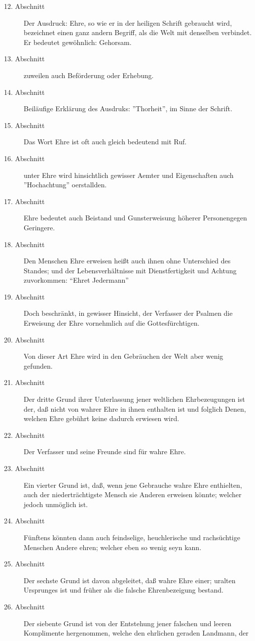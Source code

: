 \begin{description}
\item[12. Abschnitt] Der Ausdruck: Ehre, so wie er in der heiligen Schrift
gebraucht wird, bezeichnet einen ganz andern Begriff, als die Welt mit denselben
verbindet. Er bedeutet gewöhnlich: Gehorsam.
\item[13. Abschnitt] zuweilen auch Beförderung oder Erhebung.
\item[14. Abschnitt] Beiläufige Erklärung des Ausdruks: ''Thorheit'', im Sinne
der Schrift.
\item[15. Abschnitt] Das Wort Ehre ist oft auch gleich bedeutend mit Ruf.
\item[16. Abschnitt] unter Ehre wird hinsichtlich gewisser Aemter und
Eigenschaften auch ''Hochachtung'' oerstallden.
\item[17. Abschnitt] Ehre bedeutet auch Beistand und Gunsterweisung höherer
Personengegen Geringere.
\item[18. Abschnitt]  Den Menschen Ehre erweisen heißt auch ihnen ohne
Unterschied des Standes; und der Lebensverhältnisse mit Dienstfertigkeit und
Achtung zuvorkommen: "`Ehret Jedermann"'
\item[19. Abschnitt] Doch beschränkt, in gewisser Hinsicht, der Verfasser der
Psalmen die Erweisung der Ehre vornehmlich auf die Gottesfürchtigen.
\item[20. Abschnitt] Von dieser Art Ehre wird in den Gebräuchen der Welt aber
wenig gefunden.
\item[21. Abschnitt] Der dritte Grund ihrer Unterlassung jener weltlichen
Ehrbezeugungen ist der, daß nicht von wahrer Ehre in ihnen enthalten ist und
folglich Denen, welchen Ehre gebührt keine dadurch erwiesen wird.
\item[22. Abschnitt] Der Verfasser und seine Freunde sind für wahre Ehre.
\item[23. Abschnitt] Ein vierter Grund ist, daß, wenn jene Gebrauche wahre Ehre
enthielten, auch der niederträchtigste Mensch sie Anderen erweisen könnte;
welcher jedoch unmöglich ist.
\item[24. Abschnitt] Fünftens könnten dann auch feindselige, heuchlerische und
rachsüchtige Menschen Andere ehren; welcher eben so wenig seyn kann.
\item[25. Abschnitt] Der sechste Grund ist davon abgeleitet, daß wahre Ehre
einer; uralten Ursprunges ist und früher als die falsche Ehrenbezeigung bestand.
\item[26. Abschnitt] Der siebente Grund ist von der Entstehung jener falschen
und leeren Komplimente hergenommen, welche den ehrlichen geraden Landmann, der

\end{description}
